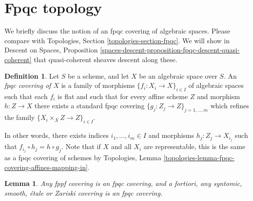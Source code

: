 \documentclass{stacks-project}
\theoremstyle{plain}
\newtheorem{lemma}[subsection]{Lemma}
\theoremstyle{definition}
\newtheorem{definition}[subsection]{Definition}
\theoremstyle{remark}
\numberwithin{equation}{subsection}
\begin{document}
\section{Fpqc topology}
\label{section-fpqc}

\noindent
We briefly discuss the notion of an fpqc covering of algebraic spaces.
Please compare with
Topologies, Section \ref{topologies-section-fpqc}.
We will show in
Descent on Spaces,
Proposition \ref{spaces-descent-proposition-fpqc-descent-quasi-coherent}
that quasi-coherent sheaves descent along these.

\begin{definition}
\label{definition-fpqc-covering}
Let $S$ be a scheme, and let $X$ be an algebraic space over $S$.
An {\it fpqc covering of $X$} is a family of morphisms
$\{f_i : X_i \to X\}_{i \in I}$ of algebraic spaces
such that each $f_i$ is flat and such that for every affine scheme
$Z$ and morphism $h : Z \to X$ there exists a standard fpqc covering
$\{g_j : Z_j \to Z\}_{j = 1, \ldots, m}$ which refines the family
$\{X_i \times_X Z \to Z\}_{i \in I}$.
\end{definition}

\noindent
In other words, there exists indices $i_1, \ldots, i_m \in I$ and
morphisms $h_j : Z_j \to X_{i_j}$ such that
$f_{i_j} \circ h_j = h \circ g_j$. Note that if $X$ and all $X_i$ are
representable, this is the same as a fpqc covering of schemes by
Topologies, Lemma \ref{topologies-lemma-fpqc-covering-affines-mapping-in}.

\begin{lemma}
\label{lemma-zariski-etale-smooth-syntomic-fppf-fpqc}
Any fppf covering is an fpqc covering, and a fortiori,
any syntomic, smooth, \'etale or Zariski covering is an fpqc covering.
\end{lemma}
\end{document}
